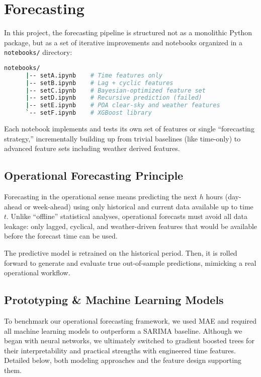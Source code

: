 \newpage
\section{Forecasting}
\label{sec:forecasting}

In this project, the forecasting pipeline is structured not as a monolithic Python 
package, but as a set of iterative improvements and notebooks organized in a 
\texttt{notebooks/} directory:
\begin{lstlisting}[language=bash, numbers=none, backgroundcolor=\color{white}]
    notebooks/
      |-- setA.ipynb    # Time features only
      |-- setB.ipynb    # Lag + cyclic features
      |-- setC.ipynb    # Bayesian-optimized feature set
      |-- setD.ipynb    # Recursive prediction (failed)
      |-- setE.ipynb    # POA clear-sky and weather features
      `-- setF.ipynb    # XGBoost library
\end{lstlisting}
    
Each notebook implements and tests its own set of features or single 
“forecasting strategy,” incrementally building up from trivial baselines (like 
time-only) to advanced feature sets including weather derived features. 

\subsection{Operational Forecasting Principle}
Forecasting in the operational sense means predicting the next $h$ hours 
(day-ahead or week-ahead) using only historical and current data available up to time 
$t$. Unlike “offline” statistical analyses, operational forecasts must avoid all data 
leakage: only lagged, cyclical, and weather-driven features that would be available 
before the forecast time can be used. 

The predictive model is retrained on the historical period. Then, it is rolled forward 
to generate and evaluate true out-of-sample predictions, mimicking a real operational 
workflow.

\subsection{Prototyping \& Machine Learning Models}
\label{subsec:model-pool}

To benchmark our operational forecasting framework, we used MAE and required all 
machine learning models to outperform a SARIMA baseline. Although we began with 
neural networks, we ultimately switched to gradient boosted trees for their 
interpretability and practical strengths with engineered time features. Detailed below,
both modeling approaches and the feature design supporting them.

